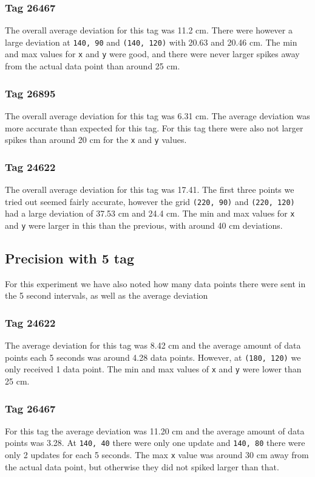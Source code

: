 \subsubsection{Tag 26467}
The overall average deviation for this tag was 11.2 cm.
There were however a large deviation at \texttt{140, 90} and \texttt{(140, 120)} with 20.63 and 20.46 cm.
The min and max values for \texttt{x} and \texttt{y} were good, and there were never larger spikes away from the actual data point than around 25 cm.

\subsubsection{Tag 26895}
The overall average deviation for this tag was 6.31 cm.
The average deviation was more accurate than expected for this tag.
For this tag there were also not larger spikes than around 20 cm for the \texttt{x} and \texttt{y} values.

\subsubsection{Tag 24622}
The overall average deviation for this tag was 17.41.
The first three points we tried out seemed fairly accurate, however the grid \texttt{(220, 90)} and \texttt{(220, 120)} had a large deviation of 37.53 cm and 24.4 cm.
The min and max values for \texttt{x} and \texttt{y} were larger in this than the previous, with around 40 cm deviations.

\subsection{Precision with 5 tag}
For this experiment we have also noted how many data points there were sent in the 5 second intervals, as well as the average deviation

\subsubsection{Tag 24622}
The average deviation for this tag was 8.42 cm and the average amount of data points each 5 seconds was around 4.28 data points.
However, at \texttt{(180, 120)} we only received 1 data point.
The min and max values of \texttt{x} and \texttt{y} were lower than 25 cm.

\subsubsection{Tag 26467}
For this tag the average deviation was 11.20 cm and the average amount of data points was 3.28.
At \texttt{140, 40} there were only one update and \texttt{140, 80} there were only 2 updates for each 5 seconds.
The max \texttt{x} value was around 30 cm away from the actual data point, but otherwise they did not spiked larger than that.


